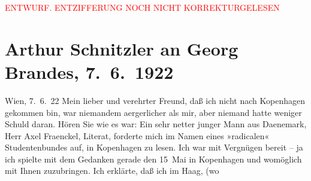 
\begin{center}
            \textcolor{red}{ENTWURF. ENTZIFFERUNG NOCH NICHT KORREKTURGELESEN}
                      \end{center}
            
               \section[Arthur Schnitzler an Georg Brandes, 7. 6. 1922]{ Arthur Schnitzler an Georg Brandes, 7. 6. 1922}\nopagebreak{}\rehead{ }\begin{ledgroupsized}[t]{13cm}\normalsize\beginnumbering{} \toendnotes[C]{\smallbreak\pagebreak[2]} 
\toendnotes[C]{\smallbreak}\pstart
           \raggedleft{}{\pb}Wien, 7. 6. 22\pend
           \pstart
           Mein lieber und verehrter Freund, daß ich nicht nach Kopenhagen gekommen bin, war niemandem
                    aergerlicher als mir, aber niemand hatte weniger Schuld daran. Hören Sie wie es
                    war: Ein sehr netter junger Mann aus Daenemark, Herr Axel Fraenckel,
                    Literat, forderte mich im Namen eines »radicalen« Studentenbundes auf, in Kopenhagen zu lesen. Ich war mit Vergnügen
                    bereit – ja ich spielte mit dem Gedanken gerade den 15 Mai in Kopenhagen und womöglich mit Ihnen
               zuzubringen. Ich erklärte, daß ich im Haag, (wo

\end{ledgroupsized}
